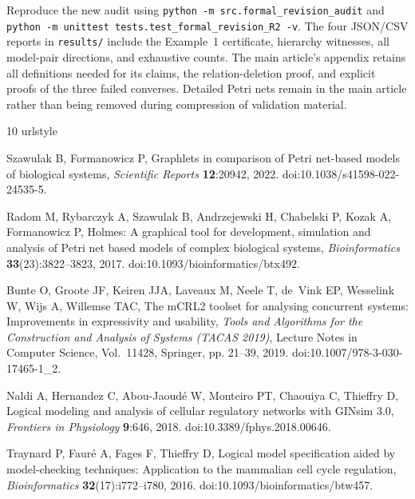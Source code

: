 \documentclass{ws-jbcb}
\numberwithin{equation}{section}
\begin{document}
Reproduce the new audit using
\texttt{python -m src.formal\_revision\_audit} and
\texttt{python -m unittest tests.test\_formal\_revision\_R2 -v}.
The four JSON/CSV reports in \texttt{results/} include the Example~1
certificate, hierarchy witnesses, all model-pair directions, and exhaustive
counts. The main article's appendix retains all definitions needed for its
claims, the relation-deletion proof, and explicit proofs of the three failed
converses. Detailed Petri nets remain in the main article rather than being
removed during compression of validation material.
\begin{thebibliography}{10}
\providecommand{\url}[1]{\texttt{#1}}
\providecommand{\urlprefix}{URL }
\expandafter\ifx\csname urlstyle\endcsname\relax
  \providecommand{\doi}[1]{doi:\discretionary{}{}{}#1}\else
  \providecommand{\doi}{doi:\discretionary{}{}{}\begingroup
  \urlstyle{rm}\Url}\fi

Szawulak B, Formanowicz P, Graphlets in comparison of {Petri} net-based models
  of biological systems, \emph{Scientific Reports} \textbf{12}:20942, 2022.
\newblock \doi{10.1038/s41598-022-24535-5}.

Radom M, Rybarczyk A, Szawulak B, Andrzejewski H, Chabelski P, Kozak A,
  Formanowicz P, Holmes: A graphical tool for development, simulation and
  analysis of {Petri} net based models of complex biological systems,
  \emph{Bioinformatics} \textbf{33}(23):3822--3823, 2017.
\newblock \doi{10.1093/bioinformatics/btx492}.

Bunte O, Groote JF, Keiren JJA, Laveaux M, Neele T, de~Vink EP, Wesselink W,
  Wijs A, Willemse TAC, The {mCRL2} toolset for analysing concurrent systems:
  Improvements in expressivity and usability,  \emph{Tools and Algorithms for
  the Construction and Analysis of Systems (TACAS 2019)}, Lecture Notes in
  Computer Science, Vol.~11428, Springer, pp. 21--39, 2019.
\newblock \doi{10.1007/978-3-030-17465-1_2}.

Naldi A, Hernandez C, Abou-Jaoud\'e W, Monteiro PT, Chaouiya C, Thieffry D,
  Logical modeling and analysis of cellular regulatory networks with {GINsim}
  3.0, \emph{Frontiers in Physiology} \textbf{9}:646, 2018.
\newblock \doi{10.3389/fphys.2018.00646}.

Traynard P, Faur\'e A, Fages F, Thieffry D, Logical model specification aided
  by model-checking techniques: Application to the mammalian cell cycle
  regulation, \emph{Bioinformatics} \textbf{32}(17):i772--i780, 2016.
\newblock \doi{10.1093/bioinformatics/btw457}.


\end{thebibliography}
\end{document}
